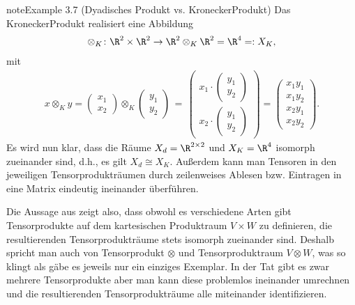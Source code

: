 \documentclass[letterpaper,10pt,german]{jupyterBook}
\begin{document}
\begin{sphinxadmonition}{note}{Example 3.7 (Dyadisches Produkt vs. Kronecker\sphinxhyphen{}Produkt)}
\sphinxAtStartPar
Das Kronecker\sphinxhyphen{}Produkt realisiert eine Abbildung
\begin{equation*}
\begin{split}\otimes_K \colon \R^2 \times \R^2 \rightarrow \R^2 \otimes_K \R^2 = \R^{4} =: X_K,\end{split}
\end{equation*}
\sphinxAtStartPar
mit
\begin{equation*}
\begin{split}x \otimes_K y =
\begin{pmatrix}
x_1 \\ x_2
\end{pmatrix} \otimes_K 
\begin{pmatrix}
y_1 \\ y_2
\end{pmatrix}
\, = \, 
\begin{pmatrix}
x_1 \cdot \begin{pmatrix} y_1 \\ y_2 \end{pmatrix} \\ 
x_2 \cdot \begin{pmatrix} y_1 \\ y_2 \end{pmatrix}
\end{pmatrix}
= 
\begin{pmatrix}
x_1y_1\\
x_1y_2\\
x_2y_1\\
x_2y_2
\end{pmatrix}.\end{split}
\end{equation*}
\sphinxAtStartPar
Es wird nun klar, dass die Räume \(X_d = \R^{2 \times 2}\) und \(X_K = \R^4\) isomorph zueinander sind, d.h., es gilt \(X_d \cong X_K\).
Außerdem kann man Tensoren in den jeweiligen Tensorprodukträumen durch zeilenweises Ablesen bzw. Eintragen in eine Matrix eindeutig ineinander überführen.
\end{sphinxadmonition}

\sphinxAtStartPar
{}

\sphinxAtStartPar
Die Aussage aus {\hyperref[\detokenize{vektoranalysis/tensor:lem:isomorphismusTensorproduktraum}]{}} zeigt also, dass obwohl es verschiedene Arten gibt Tensorprodukte auf dem kartesischen Produktraum \(V \times W\) zu definieren, die resultierenden Tensorprodukträume stets isomorph zueinander sind.
Deshalb spricht man auch von  Tensorprodukt \(\otimes\) und  Tensorproduktraum \(V \otimes W\), was so klingt als gäbe es jeweils nur ein einziges Exemplar.
In der Tat gibt es zwar mehrere Tensorprodukte aber man kann diese problemlos ineinander umrechnen und die resultierenden Tensorprodukträume alle miteinander identifizieren.
\end{document}
